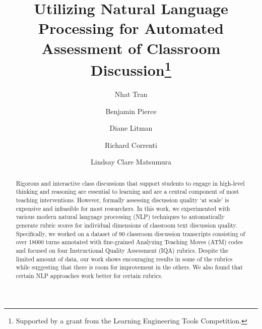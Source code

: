 \documentclass[runningheads]{llncs}
\begin{document}
%
\title{Utilizing Natural Language Processing for Automated Assessment of Classroom Discussion\thanks{Supported by a grant from the Learning Engineering Tools Competition.}}
%
%
\author{Nhat Tran \and Benjamin Pierce \and Diane Litman \and Richard Correnti \and Lindsay Clare Matsumura}
%
%

%
\maketitle              %
%
\begin{abstract}
Rigorous and interactive class discussions that support students to engage in high-level thinking and reasoning are essential to learning %
and are a central component of most teaching interventions. However, formally assessing discussion quality ‘at scale’ is expensive and infeasible for most researchers. In this work, we experimented with various modern natural language processing (NLP)  techniques to automatically generate rubric scores for individual dimensions of classroom text discussion quality. Specifically, we worked on a  dataset of 90 classroom discussion transcripts consisting of over 18000 turns annotated with fine-grained Analyzing Teaching Moves (ATM) codes and focused on four Instructional Quality Assessment (IQA) rubrics. %
Despite the limited amount of data, our work shows encouraging results in some of the rubrics while suggesting that there is room for improvement in the others. We also found that certain NLP approaches work better for certain rubrics.

\end{abstract}
%
%
%
\end{document}
